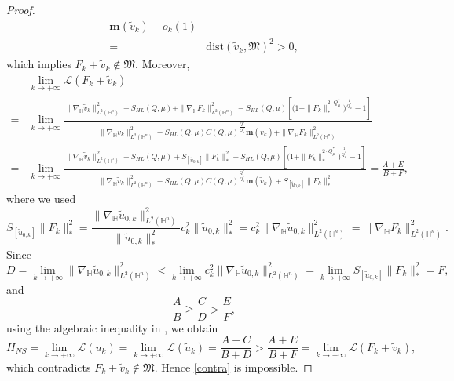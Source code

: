 \documentclass[11pt]{article}
\begin{document}
\begin{proof}
\begin{align*}
 \mathbf{m}(\tilde{v}_k)+o_k(1)\\
 =&\mathrm{dist}(\tilde{v}_k,\mathfrak{M})^2>0,
 \end{align*}
{which implies $F_k+\tilde v_k\notin\mathfrak M$. Moreover,}
 \begin{align*}
 &\lim\limits_{k\rightarrow+\infty} \mathcal{L}(F_k+\tilde{v}_k)\\=&
\lim\limits_{k\rightarrow+\infty}\frac{\|\nabla_\mathbb{H} \tilde{v}_k\|_{L^2(\mathbb{H}^n)}^2-S_{HL}(Q,\mu)+\|\nabla_\mathbb{H} F_k\|_{L^2(\mathbb{H}^n)}^2-S_{HL}(Q,\mu) \left[\Big(1+\|F_k\|_*^{2\cdot Q^{\ast}_{\mu}}\Big)^{\frac{1}{Q^{\ast}_{\mu}}}-1\right]}
{\|\nabla_\mathbb{H} \tilde{v}_k\|_{L^2(\mathbb{H}^n)}^2-S_{HL}(Q,\mu)C(Q,\mu)^{\frac{Q^{\ast}}{Q^{\ast}_{\mu}}}\mathbf{m}(\tilde{v}_k)+
\|\nabla_\mathbb{H} F_k\|_{L^2(\mathbb{H}^n)}^2}\\
=&\lim\limits_{k\rightarrow+\infty}\frac{\|\nabla_\mathbb{H} \tilde{v}_k\|_{L^2(\mathbb{H}^n)}^2-S_{HL}(Q,\mu)+S_{[\tilde{u}_{0,k}]}\|F_k\|_*^2-S_{HL}(Q,\mu) \left[\Big(1+\|F_k\|_*^{2\cdot Q^{\ast}_{\mu}}\Big)^{\frac{1}{Q^{\ast}_{\mu}}}-1\right]}
{\|\nabla_\mathbb{H} \tilde{v}_k\|_{L^2(\mathbb{H}^n)}^2-S_{HL}(Q,\mu)C(Q,\mu)^{\frac{Q^{\ast}}{Q^{\ast}_{\mu}}}\mathbf{m}(\tilde{v}_k)+
S_{[\tilde{u}_{0,k}]}\|F_k\|_*^2}
=\frac{A+E}{B+F},
\end{align*}
{where we used}
\begin{equation*}
 S_{[\tilde{u}_{0,k}]}\|F_k\|_*^2=\frac{\|\nabla_\mathbb{H} \tilde{u}_{0,k}\|_{L^2(\mathbb{H}^n)}^2}{\|\tilde{u}_{0,k}\|_*^2}c_k^2\|\tilde{u}_{0,k}\|_*^2
 =c_k^2\|\nabla_\mathbb{H} \tilde{u}_{0,k}\|_{L^2(\mathbb{H}^n)}^2=\|\nabla_\mathbb{H} F_k\|_{L^2(\mathbb{H}^n)}^2.
\end{equation*}
Since
\begin{equation*}
 D=\lim\limits_{k\rightarrow+\infty}\|\nabla_\mathbb{H} \tilde{u}_{0,k}\|_{L^2(\mathbb{H}^n)}^2<\lim\limits_{k\rightarrow+\infty}c_k^2\|\nabla_\mathbb{H} \tilde{u}_{0,k}\|_{L^2(\mathbb{H}^n)}^2
 =\lim\limits_{k\rightarrow+\infty}S_{[\tilde{u}_{0,k}]}\|F_k\|_*^2=F,
\end{equation*}
 and
 \begin{equation*}
 \frac{A}{B}\geq \frac{C}{D}>\frac{E}{F},
 \end{equation*}
 using the algebraic inequality in \cite[Lemma 2.4]{K25}, we obtain
 \begin{equation*}
 H_{NS}=\lim\limits_{k\rightarrow+\infty} \mathcal{L}(u_k)=\lim\limits_{k\rightarrow+\infty} \mathcal{L} (\tilde{u}_k)=\frac{A+C}{B+D}>\frac{A+E}{B+F}=\lim\limits_{k\rightarrow+\infty} \mathcal{L}(F_k+\tilde{v}_k),
 \end{equation*}
{which contradicts $F_k+\tilde v_k\notin\mathfrak M$. Hence \eqref{contra} is impossible.}


\end{proof}
\end{document}
